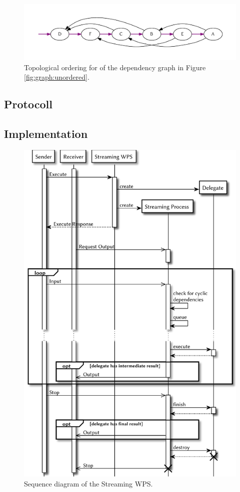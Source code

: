 	\begin{figure}[!htb]
		\centering
		\includegraphics[width=1\textwidth]{figures/ordered-graph.pdf} %
		\caption{\label{fig:graph:ordered} Topological ordering for of the dependency graph in Figure \ref{fig:graph:unordered}.}
	\end{figure}

	\subsection{Protocoll}
	\subsection{Implementation}
	\begin{figure}[!htb]
		\centering
		\includegraphics[width=.7868\textwidth]{figures/sequence-diagramm-swps.pdf}
		\caption{\label{fig:sd:swps} Sequence diagram of the Streaming WPS.}
	\end{figure}
